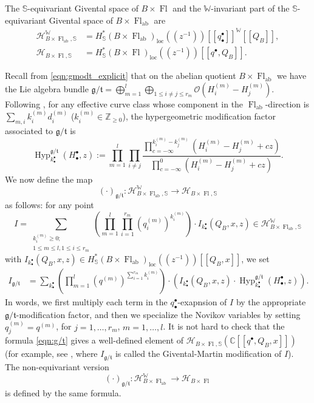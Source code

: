 \documentclass[a4paper,12pt]{amsart}
\numberwithin{equation}{section}
\theoremstyle{definition}
\newcommand{\C}{\mathbb{C}}
\newcommand{\Z}{\mathbb{Z}}
\newcommand{\bbS}{\mathbb{S}}
\newcommand{\W}{\mathbb{W}}
\newcommand{\cH}{\mathcal{H}}
\newcommand{\gt}{{\mathfrak{g}/\mathfrak{t}}}
\newcommand{\loc}{{\operatorname{loc}}}
\newcommand{\FlG}{\operatorname{Fl}}
\newcommand{\FlT}{\operatorname{Fl}_{\operatorname{ab}}}
\newcommand{\Hyp}{\operatorname{Hyp}}
\begin{document}
The $\bbS$-equivariant Givental space of $B\times\FlG$ and the $\W$-invariant part of the $\bbS$-equivariant Givental space of $B\times\FlT$ are 
\begin{align*}
\cH_{B\times\FlT,\bbS}^\W&=H^*_\bbS(B\times\FlT)_\loc(\!(z^{-1})\!)[\![q_\bullet^\bullet]\!]^\W[\![Q_B]\!], \\
\cH_{B\times\FlG,\bbS}&=H^*_\bbS(B\times\FlG)_\loc(\!(z^{-1})\!)[\![q^\bullet,Q_B]\!].
\end{align*}

Recall from \eqref{eqn:gmodt_explicit} that on the abelian quotient $B\times\FlT$ we have the Lie algebra bundle $\mathfrak{g}/\mathfrak{t}=\bigoplus_{m=1}^l\bigoplus_{1\leq i\neq j\leq r_m}\mathcal{O}\left( H_i^{(m)}-H_j^{(m)}\right)$. Following \cite{BCFK:ab/nonab},
for any effective curve class whose component in the $\FlT$-direction is $\sum_{m,i}k_i^{(m)}d_i^{(m)}$ ($k_i^{(m)}\in\Z_{\geq 0}$), the hypergeometric modification factor associated to $\mathfrak{g}/\mathfrak{t}$ is 
\begin{equation} \label{eqn:hypergeometric}
    \Hyp_{k^\bullet_\bullet}^{\mathfrak{g}/\mathfrak{t}}(H^\bullet_\bullet,z) := \prod_{m=1}^l\prod_{i\neq j}\frac{\prod_{c=-\infty}^{k_i^{(m)}-k_j^{(m)}}(H_i^{(m)}-H_j^{(m)}+cz)}{\prod_{c=-\infty}^{0}(H_i^{(m)}-H_j^{(m)}+cz)}.
\end{equation}
We now define the map 
$$
(\cdot)_\gt\colon\cH_{B\times\FlT,\bbS}^\W\to\cH_{B\times\FlG,\bbS}
$$
as follows: for any point
\[
I = \sum_{ \substack{k_i^{(m)}\geq0; \\ 1\leq m\leq l,  1\leq i\leq r_m} } \left(\prod_{m=1}^l\prod_{i=1}^{r_m} (q_i^{(m)})^{k_i^{(m)}}\right)\cdot I_{k^\bullet_\bullet}(Q_B,x,z)\in\cH_{B\times\FlT,\bbS}^\W
\]
with $I_{k_\bullet^\bullet}(Q_B,x,z)\in H^*_\bbS(B\times\FlT)_\loc(\!(z^{-1})\!)[\![Q_B,x]\!]$, we set
\begin{align}\label{eqn:g/t}
    I_\gt &= \sum_{k^\bullet_\bullet} \left( \prod_{m=1}^l (q^{(m)})^{\sum_{i=1}^{r_m}k_i^{(m)}}\right)\cdot \left(I_{k_\bullet^\bullet}(Q_B,x,z) \cdot \Hyp_{k^\bullet_\bullet}^{\mathfrak{g}/\mathfrak{t}}(H^\bullet_\bullet,z)\right).  
\end{align}
In words, we first multiply each term in the $q_\bullet^\bullet$-exapnsion of $I$ by the appropriate $\mathfrak{g}/\mathfrak{t}$-modification factor, and then we specialize the Novikov variables by setting $q_j^{(m)}=q^{(m)}$, for $j=1,\dots ,r_m$, $m=1, \dots ,l$. 
It is not hard to check that the formula \eqref{eqn:g/t} gives a well-defined element of $\cH_{B\times\FlG,\bbS}(\C[\![q^\bullet,Q_B,x]\!])$ (for example, see \cite[Lemma 4.1]{CLS}, where $I_\gt$ is called the Givental-Martin modification of $I$).
The non-equivariant version 
\[
(\cdot)_\gt\colon\cH_{B\times\FlT}^\W\to\cH_{B\times\FlG}
\] 
is defined by the same formula.
\end{document}
